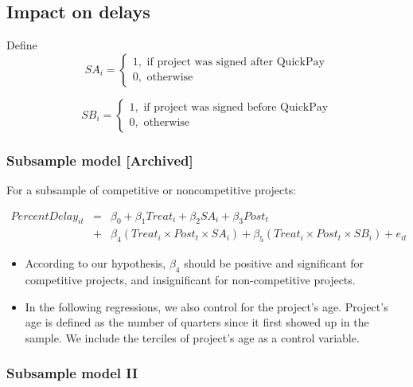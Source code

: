 \documentclass[
]{article}
\begin{document}
\hypertarget{impact-on-delays}{%
\subsection{Impact on delays}\label{impact-on-delays}}

Define
\[ SA_i = \begin{cases} 1, \text{ if project was signed after QuickPay}\\
0, \text{ otherwise} \end{cases}\]

\[ SB_i = \begin{cases} 1, \text{ if project was signed before QuickPay}\\
0, \text{ otherwise} \end{cases}\]

\hypertarget{subsample-model-archived}{%
\subsubsection{Subsample model
{[}Archived{]}}\label{subsample-model-archived}}

For a subsample of competitive or noncompetitive projects:

\[ \begin{aligned} PercentDelay_{it} &=& \beta_0 +\beta_1 Treat_i+ \beta_2 SA_i+ \beta_3 Post_t \\&+& \beta_4 (Treat_i \times Post_t \times SA_i )+\beta_5 (Treat_i \times Post_t \times SB_i )+e_{it} \end{aligned} \]

\begin{itemize}
\item
  According to our hypothesis, \(\beta_4\) should be positive and
  significant for competitive projects, and insignificant for
  non-competitive projects.
\item
  In the following regressions, we also control for the project's age.
  Project's age is defined as the number of quarters since it first
  showed up in the sample. We include the terciles of project's age as a
  control variable.
\end{itemize}

\hypertarget{subsample-model-ii}{%
\subsubsection{Subsample model II}\label{subsample-model-ii}}
\end{document}
